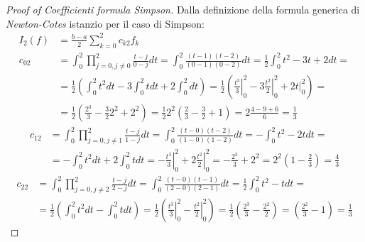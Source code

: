 \begin{proof}[Proof of Coefficienti formula Simpson]
Dalla definizione della formula generica di \emph{Newton-Cotes} istanzio per il
caso di Simpson:
\begin{displaymath}
\begin{split}
I_{2}(f) &= \frac{b-a}{2} \sum_{k = 0}^{2}{c_{k2}f_{k}} \\
c_{02} &= \int_{0}^{2}{\prod_{j=0,j\not = 0}^{2}{\frac{t-j}{0-j} dt}} = 
\int_{0}^{2}{\frac{(t-1)(t-2)}{(0-1)(0-2)}dt} = \frac{1}{2}\int_{0}^{2}{t^{2}
-3t +2 dt} = \\
&= \frac{1}{2}\left(\int_{0}^{2}{t^{2} dt} -3 \int_{0}^{2}{t dt} 
+ 2\int_{0}^{2}{dt}\right) = 
\frac{1}{2}\left(\left.\frac{t^{3}}{3}\right |_{0}^{2} -3 \left.\frac{t^{2}}{2}
\right |_{0}^{2} + 2\left.t\right |_{0}^{2}\right) = \\
&=  \frac{1}{2}\left(\frac{2^{3}}{3} - \frac{3}{2}2^{2} + 2^{2}\right) = 
\frac{1}{2} 2^{2} \left(\frac{2}{3} - \frac{3}{2} + 1\right) =
2\frac{4-9+6}{6} = \frac{1}{3}
\end{split}
\end{displaymath}
\begin{displaymath}
\begin{split}
c_{12} &= \int_{0}^{2}{\prod_{j=0,j\not = 1}^{2}{\frac{t-j}{1-j} dt}} = 
\int_{0}^{2}{\frac{(t-0)(t-2)}{(1-0)(1-2)}dt} = -\int_{0}^{2}{t^{2} -2t dt} = \\
&= -\int_{0}^{2}{t^{2} dt} +2 \int_{0}^{2}{t dt} = 
-\left.\frac{t^{3}}{3}\right |_{0}^{2} +2 \left.\frac{t^{2}}{2}
\right |_{0}^{2} =  -\frac{2^{3}}{3} + 2^{2} = 2^{2}\left(1 - \frac{2}{3}
\right) = \frac{4}{3}
\end{split}
\end{displaymath}
\begin{displaymath}
\begin{split}
c_{22} &= \int_{0}^{2}{\prod_{j=0,j\not = 2}^{2}{\frac{t-j}{2-j} dt}} = 
\int_{0}^{2}{\frac{(t-0)(t-1)}{(2-0)(2-1)}dt} = \frac{1}{2}\int_{0}^{2}{t^{2}
-t dt} = \\ 
&= \frac{1}{2}\left(\int_{0}^{2}{t^{2} dt} - \int_{0}^{2}{t dt}\right) = 
\frac{1}{2}\left(\left.\frac{t^{3}}{3}\right |_{0}^{2} - \left.\frac{t^{2}}{2}
\right |_{0}^{2}\right) = \frac{1}{2}\left(\frac{2^{3}}{3} - \frac{2^{2}}{2}
\right) = \left(\frac{2^{2}}{3} - 1 \right) = \frac{1}{3}
\end{split}
\end{displaymath}
\end{proof}


